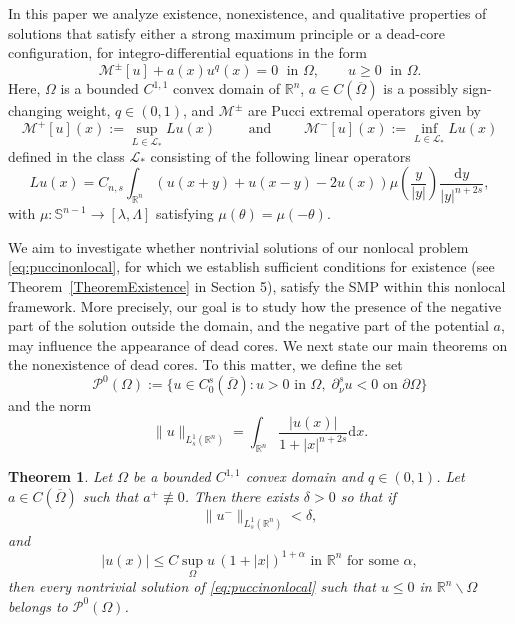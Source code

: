 \documentclass[11pt]{article}
\newtheorem{theorem}{Theorem}
\begin{document}

In this paper we analyze existence, nonexistence, and qualitative properties of solutions that satisfy either a strong maximum principle or a dead-core configuration, for integro-differential equations in the form
\begin{equation}\label{eq:puccinonlocal}
    \mathcal{M}^{\pm}[u]+a(x)u^{q}(x)=0 \; \text{ in }\Omega,\qquad u\geq 0 \; \text{ in }\Omega.
\end{equation}
Here, \(\Omega\) is a bounded $C^{1,1} $ convex domain of \(\mathbb{R}^{n}\), \(a\in C(\overline{\Omega})\) is a possibly sign-changing weight, 
\(q\in(0,1)\), and \(\mathcal{M}^{\pm}\) are Pucci extremal operators given by
\begin{equation}\label{definitionpucci}
   \mathcal{M}^{+}[u](x) :=\sup_{L\in\mathcal{L}_{*}}Lu(x) \qquad\text{ and }\qquad \mathcal{M}^{-}[u](x) :=\inf_{L\in\mathcal{L}_{*}}Lu(x)
\end{equation}
defined in the class $\mathcal{L}_{*}$ consisting of the following linear operators 
\[Lu(x)=
\textstyle 
C_{n,s}\int_{\mathbb{R}^n}( u(x+y)+u(x-y)-2u(x) )\mu\left(\frac{y}{|y|}\right)\frac{\mathrm{d}y}{|y|^{n+2s}},\] with $\mu : \mathbb{S}^{n-1} \to [\lambda,\Lambda]$ satisfying $\mu(\theta)=\mu(-\theta)$. 


We aim to investigate whether nontrivial solutions of our nonlocal problem \eqref{eq:puccinonlocal}, for which we establish sufficient conditions for existence (see Theorem~\ref{TheoremExistence} in Section 5), satisfy the SMP within this nonlocal framework.
More precisely, our goal is to study how the presence of the negative part of the solution outside the domain, and the negative part of the potential $a$, may influence the appearance of dead cores. 
We next state our main theorems on the nonexistence of dead cores. To this matter, we define the set \[\mathcal{P}^{0}(\Omega):=\{u\in C_{0}^{s}(\overline{\Omega}):u>0 \text{ in }\Omega, \;\partial^{s}_{\nu}u<0 \text{ on }\partial\Omega\}\]
and the norm
\begin{equation}\label{norm}
        \|u\|_{L^{1}_{s}(\mathbb{R}^{n})}=\int_{\mathbb{R}^{n}}\frac{|u(x)|}{1+|x|^{n+2s}}\mathrm{d}x .
    \end{equation}
   
\begin{theorem}\label{teo1} Let $\Omega$ be a bounded $C^{1,1}$ convex domain and $q\in (0,1)$.
Let \(a\in C(\overline{\Omega})\) such that $a^+\not\equiv 0$.  Then there exists \(\delta > 0\) so that if 
    $$
    \|u^{-}\|_{L^{1}_{s}(\mathbb{R}^{n})} < \delta,
    $$
    and
$$
    |u(x)|\leq C\sup_\Omega u \,(1+|x|)^{1+\alpha} \mbox{ in }\mathbb{R}^n \textrm{ for some $\alpha$}, 
$$  
    then every nontrivial solution of \eqref{eq:puccinonlocal} such that $u \leq 0 $ in $ \mathbb{R}^{n}\backslash\Omega$ 
    belongs to \(\mathcal{P}^{0}(\Omega)\).
\end{theorem}
\end{document}
